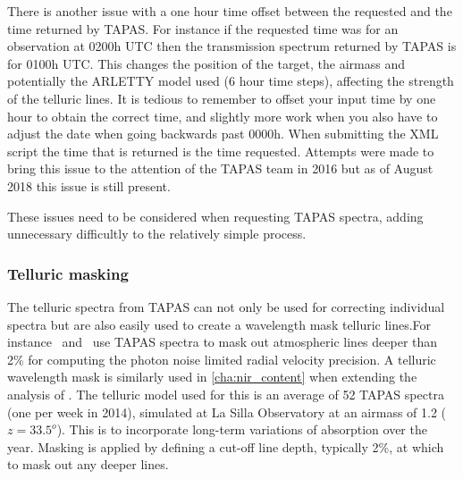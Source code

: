 There is another issue with a one hour time offset between the requested and the time returned by {TAPAS}.
For instance if the requested time was for an observation at 0200h {UTC} then the transmission spectrum returned by {TAPAS} is for 0100h {UTC}.
This changes the position of the target, the airmass and potentially the {ARLETTY} model used (6 hour time steps), affecting the strength of the telluric lines.
It is tedious to remember to offset your input time by one hour to obtain the correct time, and slightly more work when you also have to adjust the date when going backwards past 0000h.
When submitting the {XML} script the time that is returned is the time requested.
Attempts were made to bring this issue to the attention of the {TAPAS} team in 2016 but as of August 2018 this issue is still present.

These issues need to be considered when requesting {TAPAS} spectra, adding unnecessary difficultly to the relatively simple process.


\subsubsection{Telluric masking}
The telluric spectra from {TAPAS} can not only be used for correcting individual spectra but are also easily used to create a wavelength mask telluric lines.For instance~\citet{figueira_radial_2016} and~\citet{artigau_optical_2018} use {TAPAS} spectra to mask out atmospheric lines deeper than 2\% for computing the photon noise limited radial velocity precision.
A telluric wavelength mask is similarly used in \cref{cha:nir_content} when extending the analysis of \citet{figueira_radial_2016}.
The telluric model used for this is an average of 52 {TAPAS} spectra (one per week in 2014), simulated at La Silla Observatory at an airmass of 1.2 (\(z = 33.5^{o}\)).
This is to incorporate long-term variations of absorption over the year.
Masking is applied by defining a cut-off line depth, typically 2\%, at which to mask out any deeper  lines.